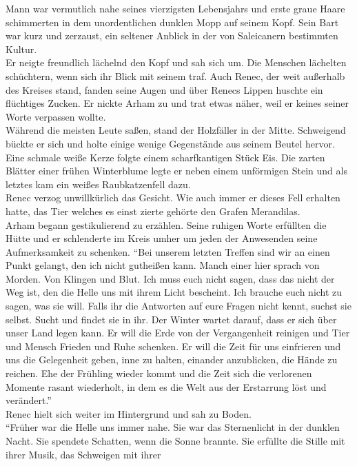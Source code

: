 Mann war vermutlich nahe seines vierzigsten Lebensjahrs und erste graue Haare schimmerten in dem 
unordentlichen dunklen Mopp auf seinem Kopf. Sein Bart war kurz und zerzaust, ein seltener Anblick 
in der von Saleicanern bestimmten Kultur.\\
Er neigte freundlich lächelnd den Kopf und sah sich um. Die Menschen lächelten schüchtern, wenn sich 
ihr Blick mit seinem traf. Auch Renec, der weit außerhalb des Kreises stand, fanden seine Augen und 
über Renecs Lippen huschte ein flüchtiges Zucken. Er nickte Arham zu und trat etwas näher, weil er 
keines seiner Worte verpassen wollte.\\
Während die meisten Leute saßen, stand der Holzfäller in der Mitte. Schweigend bückte er sich und 
holte einige wenige Gegenstände aus seinem Beutel hervor. Eine schmale weiße Kerze folgte einem 
scharfkantigen Stück Eis. Die zarten Blätter einer frühen Winterblume legte er neben einem 
unförmigen Stein und als letztes kam ein weißes Raubkatzenfell dazu.\\
Renec verzog unwillkürlich das Gesicht. Wie auch immer er dieses Fell erhalten hatte, das Tier 
welches es einst zierte gehörte den Grafen Merandilas.\\
Arham begann gestikulierend zu erzählen. Seine ruhigen Worte erfüllten die Hütte und er schlenderte 
im Kreis umher um jeden der Anwesenden seine Aufmerksamkeit zu schenken. ``Bei unserem letzten 
Treffen sind wir an einen Punkt gelangt, den ich nicht gutheißen kann. Manch einer hier sprach 
von Morden. Von Klingen und Blut. Ich muss euch nicht sagen, dass das nicht der Weg ist, den die 
Helle uns mit ihrem Licht bescheint. Ich brauche euch nicht zu sagen, was sie will. Falls ihr 
die Antworten auf eure Fragen nicht kennt, suchst sie selbst. Sucht und findet sie in ihr. Der 
Winter wartet darauf, dass er sich über unser Land legen kann. Er will die Erde von der 
Vergangenheit reinigen und Tier und Mensch Frieden und Ruhe schenken. Er will die Zeit für uns 
einfrieren und uns die Gelegenheit geben, inne zu halten, einander anzublicken, die Hände zu 
reichen. Ehe der Frühling wieder kommt und die Zeit sich die verlorenen Momente rasant wiederholt, 
in dem es die Welt aus der Erstarrung löst und verändert.''\\
Renec hielt sich weiter im Hintergrund und sah zu Boden.\\
``Früher war die Helle uns immer nahe. Sie war das Sternenlicht in der dunklen Nacht. Sie spendete 
Schatten, wenn die Sonne brannte. Sie erfüllte die Stille mit ihrer Musik, das Schweigen mit ihrer 
